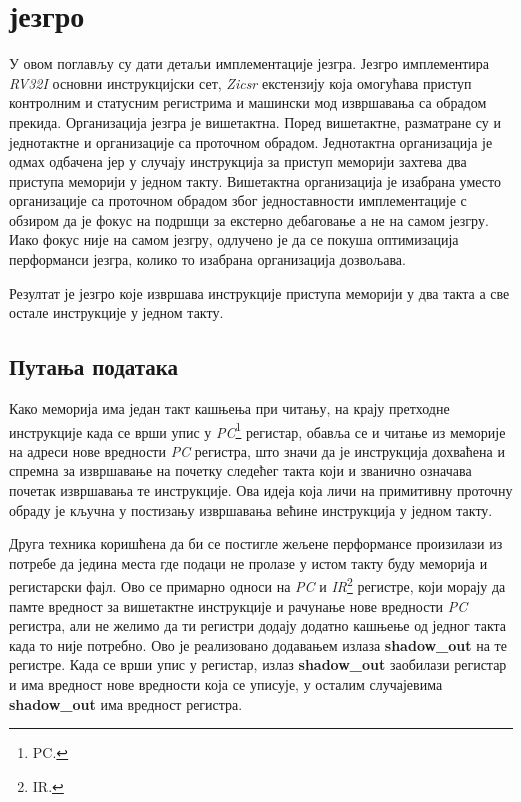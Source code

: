 \chapter{ језгро}

У овом поглављу су дати детаљи имплементације  језгра. Језгро имплементира \textit{RV32I} основни инструкцијски сет, \textit{Zicsr} екстензију која омогућава приступ контролним и статусним регистрима и машински мод извршавања са обрадом прекида.
Организација језгра је вишетактна. Поред вишетактне, разматране су и једнотактне и организације са проточном обрадом. Једнотактна организација је одмах одбачена јер у случају инструкција за приступ меморији захтева два приступа меморији у једном такту. Вишетактна организација је изабрана уместо организације са проточном обрадом због једноставности имплементације с обзиром да је фокус на подршци за екстерно дебаговање а не на самом језгру.
Иако фокус није на самом језгру, одлучено је да се покуша оптимизација перформанси језгра, колико то изабрана организација дозвољава.

Резултат је језгро које извршава инструкције приступа меморији у два такта а све остале инструкције у једном такту.

\section{Путања података}

Како меморија има један такт кашњења при читању, на крају претходне инструкције када се врши упис у \textit{\acrshort{PC}}\footnote{\acrfull{PC}.} регистар, обавља се и читање из меморије на адреси нове вредности \textit{\acrshort{PC}} регистра, што значи да је инструкција дохваћена и спремна за извршавање на почетку следећег такта који и званично означава почетак извршавања те инструкције. Ова идеја која личи на примитивну проточну обраду је кључна у постизању извршавања већине инструкција у једном такту.

Друга техника коришћена да би се постигле жељене перформансе произилази из потребе да једина места где подаци не пролазе у истом такту буду меморија и регистарски фајл. Ово се примарно односи на \textit{\acrshort{PC}} и \textit{\acrshort{IR}}\footnote{\acrfull{IR}.} регистре, који морају да памте вредност за вишетактне инструкције и рачунање нове вредности \textit{\acrshort{PC}} регистра, али не желимо да ти регистри додају додатно кашњење од једног такта када то није потребно. Ово је реализовано додавањем излаза \textbf{shadow\_out} на те регистре. Када се врши упис у регистар, излаз \textbf{shadow\_out} заобилази регистар и има вредност нове вредности која се уписује, у осталим случајевима \textbf{shadow\_out} има вредност регистра.

